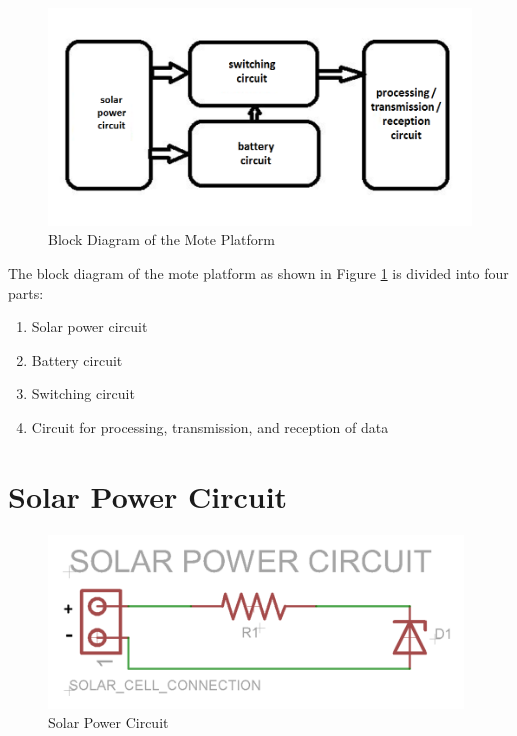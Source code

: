 \begin{figure}[htbp]
\centering
\includegraphics[width=\columnwidth]{block_dia.png}
\caption{Block Diagram of the Mote Platform}
\label{img_blockDia}
\end{figure}

The block diagram of the mote platform as shown in Figure \ref{img_blockDia} is divided into four parts:
\begin{enumerate}
\item Solar power circuit
\item Battery circuit
\item Switching circuit
\item Circuit for processing, transmission, and reception of data
\end{enumerate}

\section{Solar Power Circuit}

\begin{figure}[htbp]
\centering
\includegraphics[width=110mm]{solar_pwr_ckt.PNG}
\caption{Solar Power Circuit}
\label{img_solarPowerCircuit}
\end{figure}

